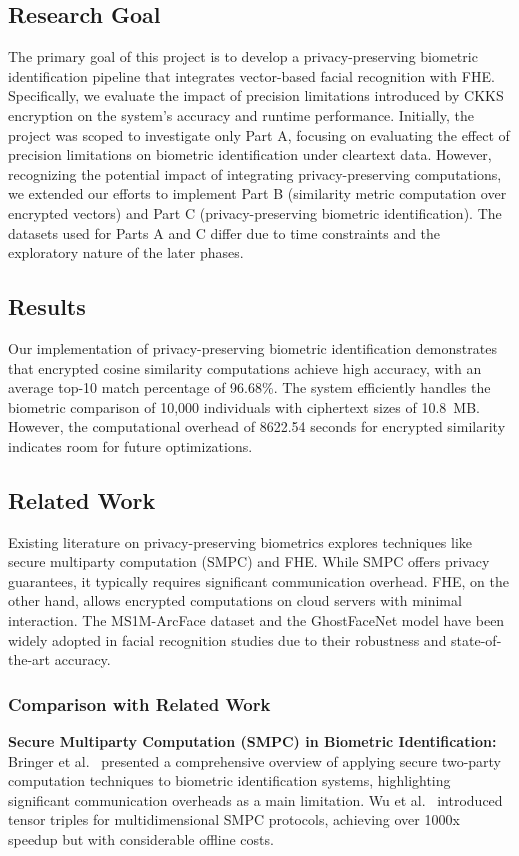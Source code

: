 \documentclass[12pt,a4paper]{article}
\begin{document}
\subsection{Research Goal}
The primary goal of this project is to develop a privacy-preserving biometric identification pipeline 
that integrates vector-based facial recognition with FHE. Specifically, we evaluate the impact of 
precision limitations introduced by CKKS encryption on the system's accuracy and runtime performance.
Initially, the project was scoped to investigate only Part A, focusing on evaluating the effect of 
precision limitations on biometric identification under cleartext data. However, recognizing the 
potential impact of integrating privacy-preserving computations, we extended our efforts to implement 
Part B (similarity metric computation over encrypted vectors) and Part C (privacy-preserving biometric 
identification). The datasets used for Parts A and C differ due to time constraints and the exploratory 
nature of the later phases.

\subsection{Results}
Our implementation of privacy-preserving biometric identification demonstrates that encrypted cosine 
similarity computations achieve high accuracy, with an average top-10 match percentage of 96.68\%. The 
system efficiently handles the biometric comparison of 10,000 individuals with ciphertext sizes of 10.8~MB. 
However, the computational overhead of 8622.54 seconds for encrypted similarity indicates room for 
future optimizations.

\subsection{Related Work}
Existing literature on privacy-preserving biometrics explores techniques like secure multiparty computation 
(SMPC) and FHE. While SMPC offers privacy guarantees, it typically requires significant communication overhead. 
FHE, on the other hand, allows encrypted computations on cloud servers with minimal interaction. The 
MS1M-ArcFace dataset and the GhostFaceNet model have been widely adopted in facial recognition studies 
due to their robustness and state-of-the-art accuracy.

\subsubsection*{Comparison with Related Work}
\textbf{Secure Multiparty Computation (SMPC) in Biometric Identification:}\\
Bringer et al.~\cite{Bringer2013} presented a comprehensive overview of applying secure two-party 
computation techniques to biometric identification systems, highlighting significant communication 
overheads as a main limitation. 
Wu et al.~\cite{Wu2023} introduced tensor triples for multidimensional SMPC protocols, 
achieving over 1000x speedup but with considerable offline costs.
\end{document}
